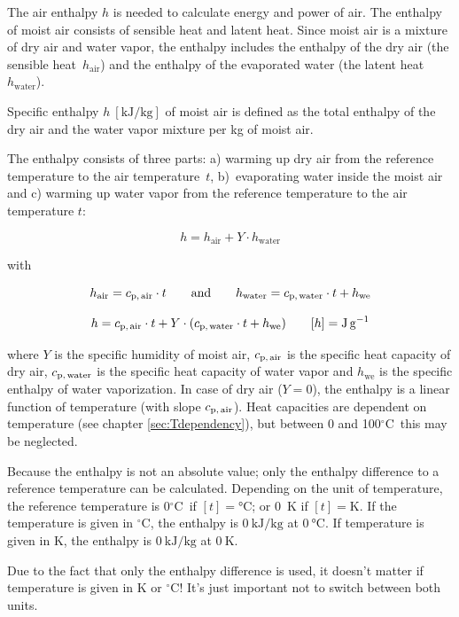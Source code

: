 \documentclass[11pt,a4paper,english,twoside]{scrreprt}
\newcommand{\gradC}{${}^\circ$C}      %
\begin{document}
The air enthalpy $h$ is needed to calculate energy and power of air. The enthalpy of moist air consists of sensible heat and latent heat. Since moist air is a mixture of dry air and water vapor, the enthalpy includes the enthalpy of the dry air (the sensible heat~$h_\text{air}$) and the enthalpy of the evaporated water (the latent heat~$h_\text{water}$).

Specific enthalpy $h\ [\text{kJ/kg}]$ of moist air is defined as the total enthalpy of the dry air and the water vapor mixture per kg of moist air.

The enthalpy consists of three parts: a) warming up dry air from the reference temperature to the air temperature~$t$, b)~evaporating water inside the moist air and c) warming up water vapor from the reference temperature to the air temperature $t$:

\begin{equation}
  \label{eqn:air_enthalpy} h=h_\text{air} +Y\cdot h_\text{water}
\end{equation}

with

\[h_\text{air} =c_\text{p,\,air} \cdot t \qquad \mbox{and} \qquad
 h_\text{water} =c_\text{p,\,water} \cdot t+h_\text{we} \]


\[
h=c_\text{p,\,air} \cdot t+Y\cdot (c_\text{p,\,water} \cdot t+h_\text{we}) \qquad [h] = \si{\joule\per\gram}
\]

where $Y$ is the specific humidity of moist air, $c_\text{p,\,air}$ is the specific heat capacity of dry air, $c_\text{p,\,water}$ is the specific heat capacity of water vapor and $h_\text{we}$ is the specific enthalpy of water vaporization. In case of dry air ($Y=0$), the enthalpy is a linear function of temperature (with slope $c_\text{p,\,air}$). Heat capacities are dependent on temperature (see chapter \ref{sec:Tdependency}), but between 0 and 100\gradC\ this may be neglected.

Because the enthalpy is not an absolute value; only the enthalpy difference to a reference temperature can be calculated. Depending on the unit of temperature, the reference temperature is 0\gradC\ if $[t] = \si{\degreeCelsius}$; or 0~K if $[t] = \si{\kelvin}$. If the temperature is given in \gradC, the enthalpy is $\SI{0}{\kilo\joule\per\kilogram}$ at $\SI{0}{\degreeCelsius}$. If temperature is given in K, the enthalpy is $\SI{0}{\kilo\joule\per\kilogram}$ at $\SI{0}{\kelvin}$.

Due to the fact that only the enthalpy difference is used, it doesn't matter if temperature is given in K or \gradC! It's just important not to switch between both units.
\end{document}
